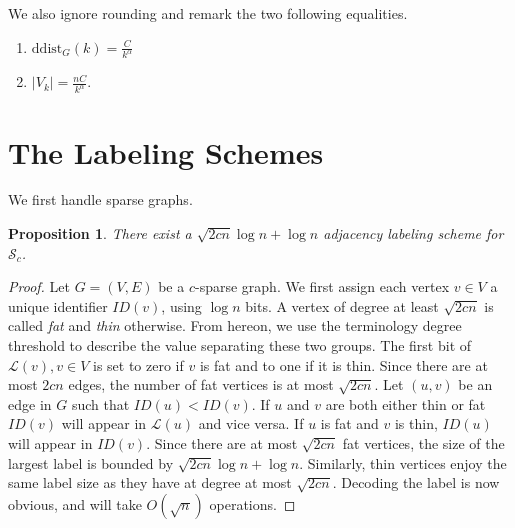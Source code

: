 \documentclass{article}
\newtheorem{proposition}{Proposition}
\theoremstyle{remark}
\newcommand{\la}{\ensuremath{ \mathcal{L}}}
\begin{document}

We also ignore rounding and remark the two following equalities.
\begin{enumerate}
\item   $\mathrm{ddist}_G(k) = \frac{C}{k^{\alpha}}$  
\item $\vert V_k \vert = \frac{nC}{k^{\alpha}}$.
\end{enumerate}

\section{The Labeling Schemes}
We first handle sparse graphs.
\begin{proposition}\label{sparse-label}
There exist a $\sqrt {2cn} \log n+ \log n$ adjacency labeling scheme for $\mathcal{S}_c$.
\end{proposition}
\begin{proof}
Let $G=(V,E)$ be a $c$-sparse graph.
We first assign each vertex $v \in V$ a unique identifier $ID(v)$, using $\log n$ bits.
A vertex of degree at least $\sqrt{2cn}$ is called \emph{fat} and \emph{thin} otherwise.
From hereon, we use the terminology degree threshold to describe the value separating these two groups.
The first bit of $\la(v), v \in V$ is set to  zero if $v$ is fat and to  one if it is thin.
Since there are at most $2cn$ edges, the number of fat vertices  is at most $\sqrt{2cn}$.
Let $(u,v)$ be an edge in $G$ such that $ID(u)<ID(v)$. 
If $u$ and $v$ are both either thin or fat $ID(v)$ will appear in $\la(u)$ and vice versa.
If $u$ is fat and $v$ is thin, $ID(u)$ will appear in $ID(v)$.
Since there are at most $\sqrt{2cn}$ fat vertices, the size of the largest label is bounded by $\sqrt{2cn} \log n +\log n$.
Similarly, thin vertices enjoy the same label size as they have at degree at most $\sqrt{2cn}$.
Decoding the label is now obvious, and will take $O(\sqrt{n})$ operations.
\end{proof}
\end{document}

